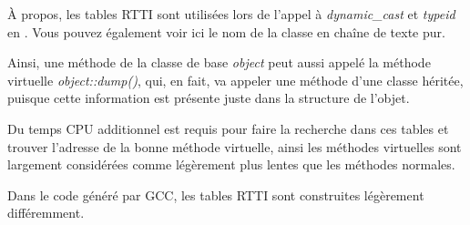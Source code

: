 À propos, les tables \ac{RTTI} sont utilisées lors de l'appel à \emph{dynamic\_cast}
et \emph{typeid} en \Cpp.
Vous pouvez également voir ici le nom de la classe en chaîne de texte pur.

Ainsi, une méthode de la classe de base \emph{object} peut aussi appelé la méthode
virtuelle \emph{object::dump()}, qui, en fait, va appeler une méthode d'une classe
héritée, puisque cette information est présente juste dans la structure de l'objet.


Du temps CPU additionnel est requis pour faire la recherche dans ces tables et trouver
l'adresse de la bonne  méthode virtuelle, ainsi les méthodes virtuelles sont largement
considérées comme légèrement plus lentes que les méthodes normales.

Dans le code généré par GCC, les tables \ac{RTTI} sont construites légèrement différemment.
